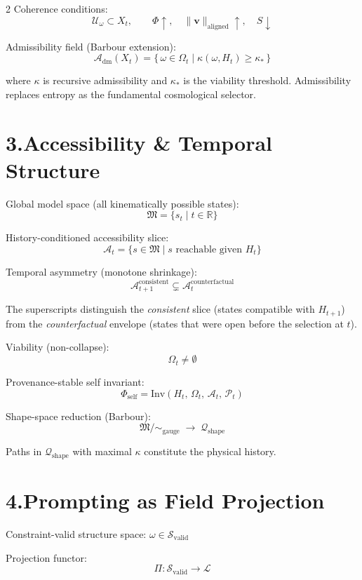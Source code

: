 \documentclass[10pt,a4paper]{article}
\theoremstyle{plain}
\theoremstyle{remark}
\newcommand{\A}{\mathcal{A}}
\newcommand{\fM}{\mathfrak{M}}
\newcommand{\Pp}{\mathcal{P}}
\newcommand{\Svalid}{\mathcal{S}_{\mathrm{valid}}}
\newcommand{\Adm}{\mathcal{A}_{\mathrm{dm}}}
\begin{document}
\begin{multicols}{2}
Coherence conditions:
\[
\mathcal{U}_\omega \subset X_t,
\qquad
\Phi \uparrow,
\quad
\|\mathbf{v}\|_{\mathrm{aligned}}\uparrow,
\quad
S\downarrow
\]

Admissibility field (Barbour extension):
\[
\Adm(X_t)
=
\bigl\{\,\omega\in\Omega_t
\;\big|\;
\kappa(\omega,H_t)\geq\kappa_*
\,\bigr\}
\]

where $\kappa$ is recursive admissibility and $\kappa_*$ is the viability threshold.
Admissibility replaces entropy as the fundamental cosmological selector.

\section*{3.\enspace Accessibility \& Temporal Structure}

Global model space (all kinematically possible states):
\[
\fM = \bigl\{s_t \mid t\in\mathbb{R}\bigr\}
\]

History-conditioned accessibility slice:
\[
\A_t
=
\bigl\{s\in\fM\mid s
\text{ reachable given }H_t\bigr\}
\]

Temporal asymmetry (monotone shrinkage):
\[
\A_{t+1}^{\mathrm{consistent}}
\subsetneq
\A_t^{\mathrm{counterfactual}}
\]

The superscripts distinguish the \emph{consistent} slice (states compatible with $H_{t+1}$) from the \emph{counterfactual} envelope (states that were open before the selection at $t$).

Viability (non-collapse):
\[
\Omega_t \neq \emptyset
\]

Provenance-stable self invariant:
\[
\Phi_{\mathrm{self}}
=
\mathrm{Inv}(H_t,\,\Omega_t,\,\A_t,\,\Pp_t)
\]

Shape-space reduction (Barbour):
\[
\fM\big/\!\sim_{\mathrm{gauge}}
\;\longrightarrow\;
\mathcal{Q}_{\mathrm{shape}}
\]

Paths in $\mathcal{Q}_{\mathrm{shape}}$ with maximal $\kappa$
constitute the physical history.

\section*{4.\enspace Prompting as Field Projection}

Constraint-valid structure space:
$\omega\in\Svalid$

Projection functor:
\[
\Pi:\Svalid\to\mathcal{L}
\]


\end{multicols}
\end{document}
